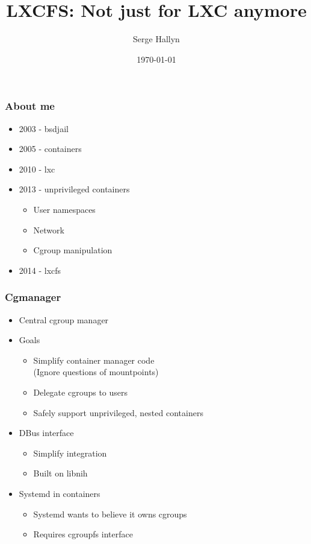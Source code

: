 \documentclass{beamer}
\title[LXCFS]{LXCFS: Not just for LXC anymore} %
\author{Serge Hallyn} %
\institute{LXC project}
\date{\today} %
\begin{document}
\begin{frame}
\titlepage %
\end{frame}

\begin{frame}[fragile]
\frametitle{About me}
\begin{itemize}
\item 2003 - bsdjail
\item 2005 - containers %
\item 2010 - lxc
\item 2013 - unprivileged containers
	\begin{itemize}
	\item User namespaces
	\item Network
	\item Cgroup manipulation
	\end{itemize}
\item 2014 - lxcfs
\end{itemize}
\end{frame}

\begin{frame}[fragile]
\frametitle{Cgmanager}
	\begin{itemize}
	\item Central cgroup manager
	\item Goals
		\begin{itemize}
		\item Simplify container manager code \\
			(Ignore questions of mountpoints)
		\item Delegate cgroups to users
		\item Safely support unprivileged, nested containers
		\end{itemize}
	\item DBus interface
		\begin{itemize}
		\item Simplify integration
		\item Built on libnih
		\end{itemize}
\pause

	\item Systemd in containers
		\begin{itemize}
		\item Systemd wants to believe it owns cgroups
		\item Requires cgroupfs interface
		\end{itemize}
	\end{itemize}
\end{frame}
\end{document}
